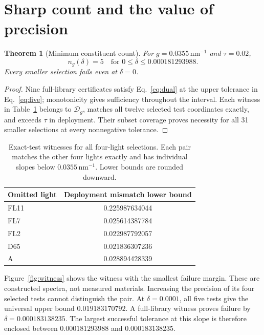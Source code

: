 \documentclass{optica-article}
\newtheorem{theorem}{Theorem}
\newcommand{\Dg}{\mathcal D_g}
\begin{document}
\section{Sharp count and the value of precision}
\begin{theorem}[Minimum constituent count]\label{thm:count}
For $g=0.0355\,\mathrm{nm}^{-1}$ and $\tau=0.02$,
\begin{equation}
 n_g(\delta)=5\quad\text{for }0\leq\delta\leq0.000181293988. \label{eq:five}
\end{equation}
Every smaller selection fails even at $\delta=0$.
\end{theorem}
\begin{proof}
Nine full-library certificates satisfy Eq.~\eqref{eq:dual} at the upper tolerance in Eq.~\eqref{eq:five}; monotonicity gives sufficiency throughout the interval. Each witness in Table~\ref{tab:four} belongs to $\Dg$, matches all twelve selected test coordinates exactly, and exceeds $\tau$ in deployment. Their subset coverage proves necessity for all 31 smaller selections at every nonnegative tolerance.
\end{proof}

\begin{table}[t]
\centering
\caption{Exact-test witnesses for all four-light selections. Each pair matches the other four lights exactly and has individual slopes below $0.0355\,\mathrm{nm}^{-1}$. Lower bounds are rounded downward.}
\label{tab:four}
\begin{tabular}{lc}
\toprule
Omitted light & Deployment mismatch lower bound\\
\midrule
FL11 & 0.225987634044\\
FL7  & 0.025614387784\\
FL2  & 0.022987792057\\
D65  & 0.021836307236\\
A    & 0.028894428339\\
\bottomrule
\end{tabular}
\end{table}

Figure~\ref{fig:witness} shows the witness with the smallest failure margin. These are constructed spectra, not measured materials. Increasing the precision of its four selected tests cannot distinguish the pair. At $\delta=0.0001$, all five tests give the universal upper bound $0.019183170792$. A full-library witness proves failure by $\delta=0.000183138235$. The largest successful tolerance at this slope is therefore enclosed between $0.000181293988$ and $0.000183138235$.
\end{document}

